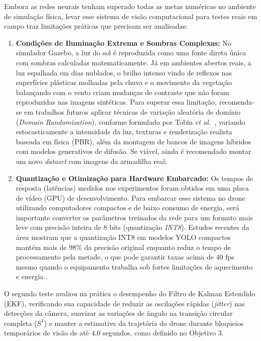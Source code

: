 Embora as redes neurais tenham superado todas as metas numéricas no ambiente de simulação física, levar esse sistema de visão computacional para testes reais em campo traz limitações práticas que precisam ser analisadas:
\begin{enumerate}
	
	\item \textbf{Condições de Iluminação Extrema e Sombras Complexas:} No simulador Gazebo, a luz do sol é reproduzida como uma fonte direta única com sombras calculadas matematicamente. Já em ambientes abertos reais, a luz espalhada em dias nublados, o brilho intenso vindo de reflexos nas superfícies plásticas molhadas pela chuva e o movimento da vegetação balançando com o vento criam mudanças de contraste que não foram reproduzidas nas imagens sintéticas. Para superar essa limitação, recomenda-se em trabalhos futuros aplicar técnicas de variação aleatória de domínio (\textit{Domain Randomization}), conforme formulado por Tobin \textit{et al.}~\cite{tobin2017domain}, variando estocasticamente a intensidade da luz, texturas e renderização realista baseada em física (PBR), além da montagem de bancos de imagens híbridos com modelos generativos de difusão. Se viável, ainda é recomendado montar um novo \textit{dataset} com imagens da armadilha real;
	
	\item \textbf{Quantização e Otimização para Hardware Embarcado:} Os tempos de resposta (latências) medidos nos experimentos foram obtidos em uma placa de vídeo (GPU) de desenvolvimento. Para embarcar esse sistema no drone utilizando computadores compactos e de baixo consumo de energia, será importante converter os parâmetros treinados da rede para um formato mais leve com precisão inteira de 8 bits (quantização \textit{INT8}). Estudos recentes da área mostram que a quantização INT8 em modelos YOLO compactos mantém mais de $98\%$ da precisão original enquanto reduz o tempo de processamento pela metade, o que pode garantir taxas acima de 40 fps mesmo quando o equipamento trabalha sob fortes limitações de aquecimento e energia \cite{rey2025performance}.
	
\end{enumerate}


O segundo teste avaliou na prática o desempenho do Filtro de Kalman Estendido (EKF), verificando sua capacidade de reduzir as oscilações rápidas (\textit{jitter}) nas detecções da câmera, suavizar as variações de ângulo na transição circular completa ($S^1$) e manter a estimativa da trajetória do drone durante bloqueios temporários de visão de até 4,0 segundos, como definido no Objetivo 3.

